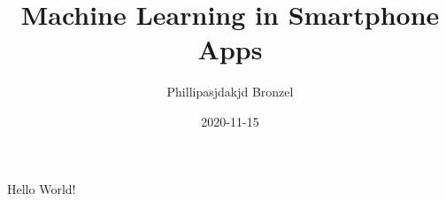 \documentclass[twoside]{article}
\title{Machine Learning in Smartphone Apps}
\date{2020-11-15}
\author{Phillipasjdakjd Bronzel}
\begin{document}
  \maketitle
  \newpage
  \tableofcontents
  \newpage

  Hello World!
\end{document}
